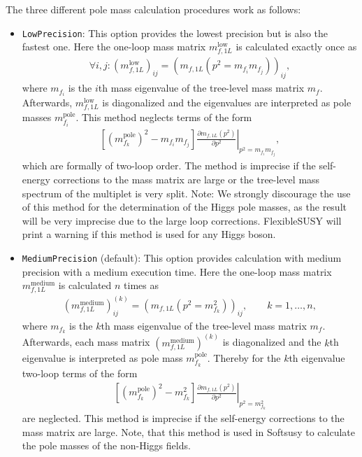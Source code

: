 \documentclass[final,3p,11pt,pdflatex]{elsarticle}
\makeatletter
\newcommand{\fs}{FlexibleSUSY\@\xspace}
\newcommand{\code}[1]{\lstinline|#1|}  %
\newcommand{\pole}{\text{pole}}
\makeatother
\begin{document}
The three different pole mass calculation procedures work as follows:
%
\begin{itemize}
\item \code{LowPrecision}: This option provides the lowest precision
  but is also the fastest one.  Here the one-loop mass matrix
  $m_{f,1L}^\text{low}$ is calculated exactly once as
%
  \begin{align}
    \forall i,j: (m_{f,1L}^\text{low})_{ij} = (m_{f,1L}(p^2 = m_{f_i}
    m_{f_j}))_{ij} ,
  \end{align}
%
  where $m_{f_i}$ is the $i$th mass eigenvalue of the tree-level mass
  matrix $m_f$.  Afterwards, $m_{f,1L}^\text{low}$ is diagonalized and
  the eigenvalues are interpreted as pole masses $m_{f_i}^\pole$.
  This method neglects terms of the form
  \begin{align}
    \left[(m_{f_k}^\pole)^2 - m_{f_i}m_{f_j}\right]
    \left.\frac{\partial m_{f,1L}(p^2)}{\partial
        p^2}\right|_{p^2=m_{f_i}m_{f_j}} ,
  \end{align}
  which are formally of two-loop order.  The method is imprecise if
  the self-energy corrections to the mass matrix are large or the
  tree-level mass spectrum of the multiplet is very split.  Note: We
  strongly discourage the use of this method for the determination of the
  Higgs pole masses, as the result will be very imprecise due to the
  large loop corrections.  \fs will print a warning if this method is
  used for any Higgs boson.

\item \code{MediumPrecision} (default): This option
  provides calculation with medium precision with a medium execution
  time.  Here the one-loop mass matrix $m_{f,1L}^\text{medium}$ is
  calculated $n$ times as
%
  \begin{align}
    (m_{f,1L}^\text{medium})_{ij}^{(k)} = (m_{f,1L}(p^2 =
    m_{f_k}^2))_{ij} , \qquad k = 1,\ldots,n ,
  \end{align}
%
  where $m_{f_k}$ is the $k$th mass eigenvalue of the tree-level mass
  matrix $m_f$.  Afterwards, each mass matrix
  $(m_{f,1L}^\text{medium})^{(k)}$ is diagonalized and the $k$th
  eigenvalue is interpreted as pole mass $m_{f_k}^\pole$.  Thereby for
  the $k$th eigenvalue two-loop terms of the form
  \begin{align}
    \left[(m_{f_k}^\pole)^2 - m_{f_k}^2\right] \left.\frac{\partial
        m_{f,1L}(p^2)}{\partial p^2}\right|_{p^2=m_{f_k}^2}
  \end{align}
  are neglected.  This method is imprecise if the self-energy
  corrections to the mass matrix are large.  Note, that this method is
  used in Softsusy to calculate the pole masses of the non-Higgs
  fields.


\end{itemize}
\end{document}
